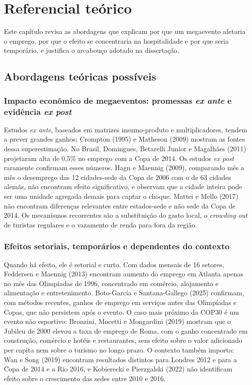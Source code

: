 \chapter{Referencial teórico}\label{cap:referencial}

Este capítulo revisa as abordagens que explicam por que um megaevento afetaria o emprego, por que o efeito se concentraria na hospitalidade e por que seria temporário, e justifica o arcabouço adotado na dissertação.

\section{Abordagens teóricas possíveis}

\subsection{Impacto econômico de megaeventos: promessas \textit{ex ante} e evidência \textit{ex post}}\label{sub:megaeventos}

Estudos \textit{ex ante}, baseados em matrizes insumo-produto e
multiplicadores, tendem a prever grandes ganhos; Crompton (1995) e Matheson
(2009) mostram as fontes dessa superestimação. No Brasil, Domingues,
Betarelli Junior e Magalhães (2011) projetaram alta de 0,5\% no emprego com a
Copa de 2014. Os estudos \textit{ex post} raramente confirmam esses números.
Hagn e Maennig (2009), comparando mês a mês o desemprego das 12 cidades-sede da
Copa de 2006 com o de 63 cidades alemãs, não encontram efeito significativo, e
observam que a cidade inteira pode ser uma unidade agregada demais para captar
o choque. Mattei e Mello (2017) não encontram diferenças relevantes entre
estados-sede e não sede da Copa de 2014. Os mecanismos recorrentes são a
substituição do gasto local, o \textit{crowding out} de turistas regulares e o
vazamento de renda para fora da região.

\subsection{Efeitos setoriais, temporários e dependentes do contexto}\label{sub:setoriais}

Quando há efeito, ele é setorial e curto. Com dados mensais de 16 setores,
Feddersen e Maennig (2013) encontram aumento do emprego em Atlanta apenas no
mês das Olimpíadas de 1996, concentrado em comércio, alojamento e alimentação e
entretenimento. Boto-García e Santana-Gallego (2025) confirmam, com métodos
recentes, ganhos de emprego em serviços antes das Olimpíadas e Copas, que não
persistem após o evento. O caso mais próximo da COP30 é um evento não
esportivo: Bronzini, Mocetti e Mongardini (2019) mostram que o Jubileu de 2000
elevou a taxa de emprego de Roma, com o ganho concentrado em construção,
comércio e hotéis e restaurantes, sem efeito sobre o valor adicionado per
capita nem sobre o turismo no longo prazo. O contexto também importa: Wan e
Song (2019) encontram resultados distintos para Londres 2012 e para a Copa de
2014 e a Rio 2016, e Kobierecki e Pierzgalski (2022) não identificam efeito
sobre o crescimento das sedes entre 2010 e 2016.

